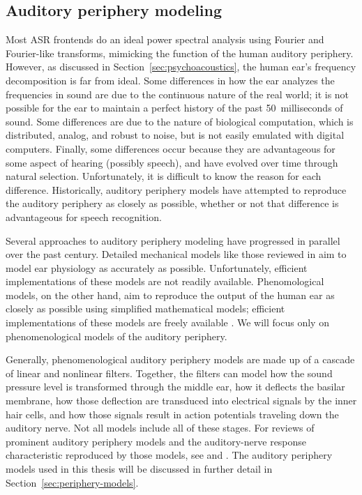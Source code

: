 \subsection{Auditory periphery modeling}

Most ASR frontends do an ideal
power spectral analysis
using Fourier and Fourier-like transforms,
mimicking the function
of the human auditory periphery.
However, as discussed in Section~\ref{sec:psychoacoustics},
the human ear's frequency decomposition
is far from ideal.
Some differences in how the ear
analyzes the frequencies in sound
are due to the continuous nature
of the real world;
it is not possible for the ear
to maintain a perfect history
of the past 50~milliseconds of sound.
Some differences are due to
the nature of biological computation,
which is distributed, analog, and robust to noise,
but is not easily emulated with digital computers.
Finally, some differences
occur because they are advantageous
for some aspect of hearing
(possibly speech),
and have evolved over time through natural selection.
Unfortunately, it is difficult to know
the reason for each difference.
Historically, auditory periphery models
have attempted to reproduce
the auditory periphery as closely as possible,
whether or not that difference is advantageous
for speech recognition.

Several approaches to auditory periphery modeling
have progressed in parallel over the past century.
Detailed mechanical models
like those reviewed in \citet{ni2014}
aim to model ear physiology
as accurately as possible.
Unfortunately, efficient implementations
of these models are not readily available.
Phenomological models, on the other hand,
aim to reproduce the output
of the human ear
as closely as possible
using simplified mathematical models;
efficient implementations of these
models are freely available
\citep{fontaine2011}.
We will focus only on phenomenological
models of the auditory periphery.

Generally, phenomenological auditory periphery models
are made up of a cascade of linear and nonlinear filters.
Together, the filters can model
how the sound pressure level
is transformed through the middle ear,
how it deflects the basilar membrane,
how those deflection are transduced
into electrical signals
by the inner hair cells,
and how those signals result in
action potentials traveling down
the auditory nerve.
Not all models include all of these stages.
For reviews of prominent
auditory periphery models and
the auditory-nerve response characteristic
reproduced by those models,
see \citet{lopez2005}
and \citet{lyon2010}.
The auditory periphery models used
in this thesis will be discussed
in further detail in
Section~\ref{sec:periphery-models}.

